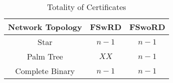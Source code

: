		\begin{table}[!htb]
			\begin{center}
				\caption{Totality of Certificates}
				\label{tab:analysis-table-2}
				\begin{tabular}{|c||c|c|}
					\hline
					Network Topology & FSwRD & FSwoRD \\
					\hline
					Star & $n - 1$ & $n -1$ \\
					\hline
					Palm Tree & $XX$ & $n - 1$\\
					\hline
					Complete Binary & $n - 1$ & $n - 1$\\
					\hline
				\end{tabular}
			\end{center}
		\end{table}


